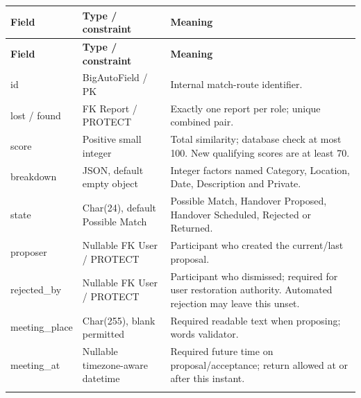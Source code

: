 \documentclass[12pt,a4paper,oneside]{report}
\begin{document}
\begin{longtable}{@{}P{0.24\dimexpr\textwidth-24pt\relax}P{0.28\dimexpr\textwidth-24pt\relax}P{0.48\dimexpr\textwidth-24pt\relax}@{}}

\toprule \textbf{Field} & \textbf{Type / constraint} & \textbf{Meaning} \\ \midrule\endfirsthead

\toprule \textbf{Field} & \textbf{Type / constraint} & \textbf{Meaning} \\ \midrule\endhead

\bottomrule\endfoot

id & BigAutoField / PK & Internal match-route identifier. \\ \addlinespace[3pt]

lost / found & FK Report / PROTECT & Exactly one report per role; unique combined pair. \\ \addlinespace[3pt]

score & Positive small integer & Total similarity; database check at most 100. New qualifying scores are at least 70. \\ \addlinespace[3pt]

breakdown & JSON, default empty object & Integer factors named Category, Location, Date, Description and Private. \\ \addlinespace[3pt]

state & Char(24), default Possible Match & Possible Match, Handover Proposed, Handover Scheduled, Rejected or Returned. \\ \addlinespace[3pt]

proposer & Nullable FK User / PROTECT & Participant who created the current/last proposal. \\ \addlinespace[3pt]

rejected\_by & Nullable FK User / PROTECT & Participant who dismissed; required for user restoration authority. Automated rejection may leave this unset. \\ \addlinespace[3pt]

meeting\_place & Char(255), blank permitted & Required readable text when proposing; words validator. \\ \addlinespace[3pt]

meeting\_at & Nullable timezone-aware datetime & Required future time on proposal/acceptance; return allowed at or after this instant. \\ \addlinespace[3pt]

\end{longtable}
\end{document}

